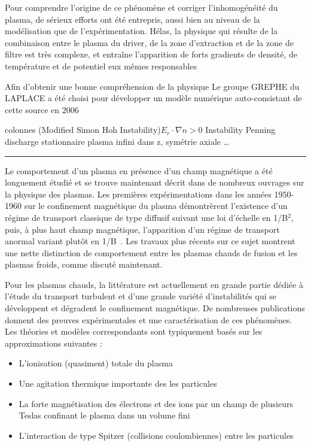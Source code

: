\begin{refsection}
Pour
comprendre l'origine de ce phénomène et corriger l'inhomogénéité du plasma, de
sérieux efforts ont été entrepris, aussi bien au niveau de la modélisation que
de l'expérimentation. Hélas, la physique qui résulte de la combinaison entre le
plasma du driver, de la zone d'extraction et de la zone de filtre est très
complexe, et entraîne l'apparition de forts gradients de densité, de température
et de potentiel eux mêmes responsables 


 Afin d'obtenir une bonne
compréhension de la physique Le groupe GREPHE du LAPLACE a été choisi pour développer un modèle numérique auto-consistant de cette source en 2006

colonnes
\parencite{RosenbluthSimon}
\parencite{Sakawa} (Modified Simon Hoh Instability)$E_r\cdot\nabla n > 0$
\parencite{Hoh} Instability Penning discharge
\parencite{Fruchtman} stationnaire
\parencite{Sternberg} plasma infini dans z, symétrie axiale \ldots 

\parencite{Rosenbluth}\parencite{Chandrasekhar}
\begin{center}
\rule{0.6\textwidth}{1pt}
\end{center}

Le comportement d'un plasma en présence d'un champ magnétique a été
longuement étudié et se trouve maintenant décrit dans de nombreux ouvrages sur
la physique des plasmas.
Les premières expérimentations dans les années 1950-1960 sur le confinement
magnétique du plasma démontrèrent l'existence d'un régime de transport classique
de type diffusif suivant une loi d'échelle en 1/B$^2$, puis, à plus haut champ
magnétique, l'apparition d'un régime de transport anormal variant plutôt en
1/B~\parencite{Bohm,Simon55,Yoshikawa,Janes,Rozhansky}. Les travaux plus
récents sur ce sujet montrent une nette distinction de
comportement entre les plasmas chauds de fusion et les plasmas froids, comme
discuté maintenant.

Pour les plasmas chauds, la littérature est actuellement en grande partie dédiée
à l'étude du transport turbulent et d'une grande variété d'instabilités qui
se développent et dégradent le confinement magnétique. De nombreuses
publications donnent des preuves expérimentales et une caractérisation de ces
phénomènes. Les théories et modèles correspondants sont typiquement basés sur
les approximations suivantes :

\begin{itemize}
  \item L'ionisation (quasiment) totale du plasma
  \item Une agitation thermique importante des les particules
  \item La forte magnétisation des électrons et des ions par un champ de
  plusieurs Teslas confinant le plasma dans un volume fini
  \item L'interaction de type Spitzer (collisions coulombiennes) entre les
  particules
\end{itemize}


\end{refsection}
